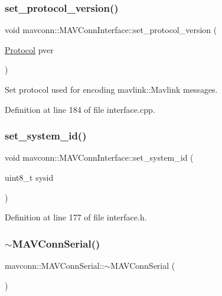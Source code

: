 \subsubsection{\texorpdfstring{set\_protocol\_version()}{set\_protocol\_version()}}
{\footnotesize\ttfamily void mavconn\+::\+M\+A\+V\+Conn\+Interface\+::set\+\_\+protocol\+\_\+version (\begin{DoxyParamCaption}\item[{\mbox{\hyperlink{group__mavconn_gae4e5498ebfd232dcad75be0f8a168ff3}{Protocol}}}]{pver }\end{DoxyParamCaption})}

Set protocol used for encoding mavlink\+::\+Mavlink messages. 

Definition at line 184 of file interface.\+cpp.

\mbox{\label{group__mavconn_gaf2828d99a65c8e631566e7fd564abac3}} 
\subsubsection{\texorpdfstring{set\_system\_id()}{set\_system\_id()}}
{\footnotesize\ttfamily void mavconn\+::\+M\+A\+V\+Conn\+Interface\+::set\+\_\+system\+\_\+id (\begin{DoxyParamCaption}\item[{uint8\+\_\+t}]{sysid }\end{DoxyParamCaption})\hspace{0.3cm}{\ttfamily [inline]}}



Definition at line 177 of file interface.\+h.

\mbox{\label{group__mavconn_ga63860bdb6f3eb8a5ef266fc99edd715d}} 
\subsubsection{\texorpdfstring{$\sim$MAVConnSerial()}{~MAVConnSerial()}}
{\footnotesize\ttfamily mavconn\+::\+M\+A\+V\+Conn\+Serial\+::$\sim$\+M\+A\+V\+Conn\+Serial (\begin{DoxyParamCaption}{ }\end{DoxyParamCaption})}



